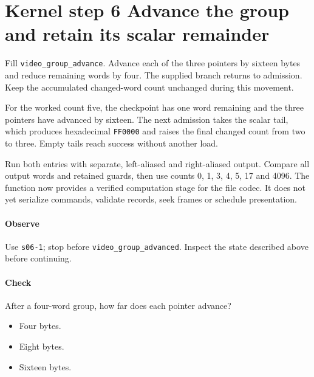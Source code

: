\section{Kernel step 6 Advance the group and retain its scalar remainder}
Fill \texttt{video\_group\_advance}. Advance each of the three pointers by sixteen bytes and reduce remaining words by four. The supplied branch returns to admission. Keep the accumulated changed-word count unchanged during this movement.

For the worked count five, the checkpoint has one word remaining and the three pointers have advanced by sixteen. The next admission takes the scalar tail, which produces hexadecimal \texttt{FF0000} and raises the final changed count from two to three. Empty tails reach success without another load.

Run both entries with separate, left-aliased and right-aliased output. Compare all output words and retained guards, then use counts 0, 1, 3, 4, 5, 17 and 4096. The function now provides a verified computation stage for the file codec. It does not yet serialize commands, validate records, seek frames or schedule presentation.

\paragraph{Observe} Use \texttt{s06-1}; stop before \texttt{video\_group\_advanced}. Inspect the state described above before continuing.

\paragraph{Check} After a four-word group, how far does each pointer advance?
\begin{itemize}
\item[A.] Four bytes.
\item[B.] Eight bytes.
\item[C.] Sixteen bytes.
\end{itemize}
